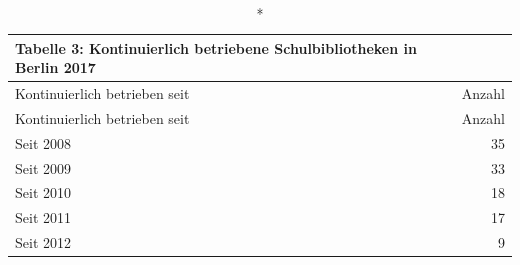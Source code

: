 \documentclass[a4paper,
fontsize=11pt,
oneside,
numbers=noperiodatend,
parskip=half-,
bibliography=totoc,
final
]{scrartcl}
\begin{document}
\begin{longtable}[]{@{}lr@{}}
\caption*{Tabelle 3: Kontinuierlich betriebene Schulbibliotheken in Berlin
2017}\tabularnewline
\toprule
\begin{minipage}[b]{0.42\columnwidth}\raggedright\strut
Kontinuierlich betrieben seit\strut
\end{minipage} & \begin{minipage}[b]{0.10\columnwidth}\raggedleft\strut
Anzahl\strut
\end{minipage}\tabularnewline
\midrule
\endfirsthead
\toprule
\begin{minipage}[b]{0.42\columnwidth}\raggedright\strut
Kontinuierlich betrieben seit\strut
\end{minipage} & \begin{minipage}[b]{0.10\columnwidth}\raggedleft\strut
Anzahl\strut
\end{minipage}\tabularnewline
\midrule
\endhead
\begin{minipage}[t]{0.42\columnwidth}\raggedright\strut
Seit 2008\strut
\end{minipage} & \begin{minipage}[t]{0.10\columnwidth}\raggedleft\strut
35\strut
\end{minipage}\tabularnewline
\begin{minipage}[t]{0.42\columnwidth}\raggedright\strut
Seit 2009\strut
\end{minipage} & \begin{minipage}[t]{0.10\columnwidth}\raggedleft\strut
33\strut
\end{minipage}\tabularnewline
\begin{minipage}[t]{0.42\columnwidth}\raggedright\strut
Seit 2010\strut
\end{minipage} & \begin{minipage}[t]{0.10\columnwidth}\raggedleft\strut
18\strut
\end{minipage}\tabularnewline
\begin{minipage}[t]{0.42\columnwidth}\raggedright\strut
Seit 2011\strut
\end{minipage} & \begin{minipage}[t]{0.10\columnwidth}\raggedleft\strut
17\strut
\end{minipage}\tabularnewline
\begin{minipage}[t]{0.42\columnwidth}\raggedright\strut
Seit 2012\strut
\end{minipage} & \begin{minipage}[t]{0.10\columnwidth}\raggedleft\strut
9\strut

\end{minipage}
\end{longtable}
\end{document}
